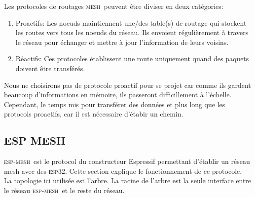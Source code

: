 \documentclass[a4paper, 12pt]{report}
\newcommand{\esp}{\textsc{esp32}}
\newcommand{\espmesh}{\textsc{esp-mesh}}
\newcommand{\mesh}{\textsc{mesh}}
\begin{document}
    Les protocoles de routages \mesh\ peuvent être diviser en deux catégories:
    \begin{enumerate}
        \item Proactifs: Les noeuds maintiennent une/des table(s) de routage
            qui stockent les routes vers tous les noeuds du réseau. 
            Ils envoient régulièrement à travers le réseau pour échanger et 
            mettre à jour l'information de leurs voisins.
        \item Réactifs: Ces protocoles établissent une route uniquement quand des paquets
            doivent être transférés.
    \end{enumerate}
    Nous ne choisirons pas de protocole proactif pour se projet car comme ils gardent
    beaucoup d'informations en mémoire, ils passeront difficillement à l'échelle.
    Cependant, le temps mis pour transférer des données et plus long que les protocols proactifs,
    car il est nécessaire d'étabir un chemin.\\

    \subsection{ESP MESH}
        \espmesh\ est le protocol du constructeur Espressif permettant d'établir un réseau mesh avec des \esp.
        Cette section explique le fonctionnement de ce protocole.\\
        La topologie ici utilisée est l'arbre. La racine de l'arbre est la seule interface entre le
        réseau \espmesh\ et le reste du réseau.\\
\end{document}
